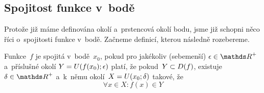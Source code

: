 \subsection{Spojitost funkce v~bodě}
\label{subsec:limita-spojitost-v-bode}

Protože již máme definována okolí a~prstencová okolí bodu, jsme již schopni něco říci
o~spojitosti funkce v~bodě. Začneme definicí, kterou následně rozebereme.

\begin{definition}
    \label{def:funkce-spojitost-v-bode}
    Funkce~$f$ je spojitá v~bodě~$x_0$, pokud pro jakékoliv (sebemenší)
    ${\epsilon \in \positive\reals}$ a~příslušné okolí ${Y = U(f(x_0); \epsilon)}$
    platí, že pokud~${Y \subset D(f)}$, existuje ${\delta \in \positive\reals}$
    a~k~němu okolí~${X = U(x_0; \delta)}$ takové, že
    \begin{equation*}
        \forall x \in X : f(x) \in Y
    \end{equation*}
\end{definition}

